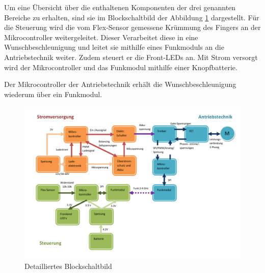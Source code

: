 Um eine Übersicht über die enthaltenen Komponenten der drei genannten Bereiche zu erhalten, sind sie im Blockschaltbild der Abbildung \ref{fig:grobkonzeptblockschaltbilddetailliert} dargestellt. Für die Steuerung wird die vom Flex-Sensor gemessene Krümmung des Fingers an der Mikrocontroller weitergeleitet. Dieser Verarbeitet diese in eine Wunschbeschleunigung und leitet sie mithilfe eines Funkmoduls an die Antriebstechnik weiter. Zudem steuert er die Front-LEDs an. Mit Strom versorgt wird der Mikrocontroller und das Funkmodul mithilfe einer Knopfbatterie. 

Der Mikrocontroller der Antriebstechnik erhält die Wunschbeschleunigung wiederum über ein Funkmodul. 



\begin{figure}[h]
	\centering
	\includegraphics[width=\linewidth]{images/Grobkonzept_Blockschaltbild_detailliert}
	\caption[Detailliertes Blockschaltbild]{Detailliertes Blockschaltbild}
	\label{fig:grobkonzeptblockschaltbilddetailliert}
\end{figure}

